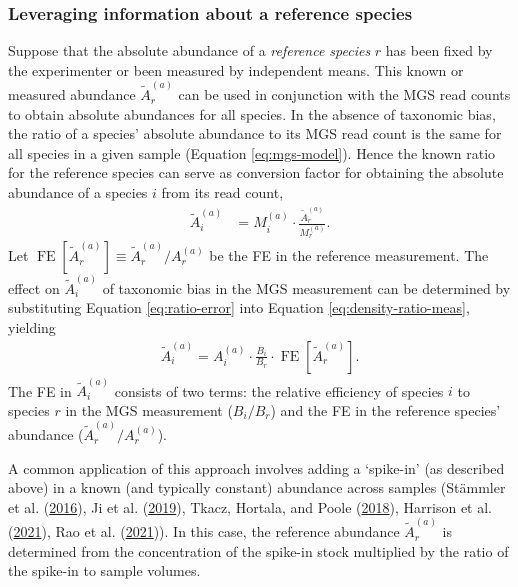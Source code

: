 \documentclass[
]{article}
\begin{document}
\hypertarget{leveraging-information-about-a-reference-species}{%
\subsubsection{Leveraging information about a reference species}\label{leveraging-information-about-a-reference-species}}

Suppose that the absolute abundance of a \emph{reference species} \(r\) has been fixed by the experimenter or been measured by independent means.
This known or measured abundance \(\tilde A_{r}^{(a)}\) can be used in conjunction with the MGS read counts to obtain absolute abundances for all species.
In the absence of taxonomic bias, the ratio of a species' absolute abundance to its MGS read count is the same for all species in a given sample (Equation \eqref{eq:mgs-model}).
Hence the known ratio for the reference species can serve as conversion factor for obtaining the absolute abundance of a species \(i\) from its read count,
\begin{align}
  \label{eq:density-ratio-meas}
  \tilde A_i^{(a)} &= M_i^{(a)} \cdot \frac{\tilde A_r^{(a)}}{M_r^{(a)}}.
\end{align}
Let \(\mathop{\mathrm{FE}}[\tilde A_r^{(a)}] \equiv {\tilde A_r^{(a)}}/{A_r^{(a)}}\) be the FE in the reference measurement.
The effect on \(\tilde A_i^{(a)}\) of taxonomic bias in the MGS measurement can be determined by substituting Equation \eqref{eq:ratio-error} into Equation \eqref{eq:density-ratio-meas}, yielding
\begin{align}
  \label{eq:density-ratio-error}
  \tilde A_i^{(a)} = A_i^{(a)} \cdot \frac{B_i}{B_r} \cdot 
    \mathop{\mathrm{FE}}\left[\tilde A_r^{(a)}\right].
\end{align}
The FE in \(\tilde A_i^{(a)}\) consists of two terms: the relative efficiency of species \(i\) to species \(r\) in the MGS measurement (\({B_i}/{B_r}\)) and the FE in the reference species' abundance (\({\tilde A_r^{(a)}}/{A_r^{(a)}}\)).

A common application of this approach involves adding a `spike-in' (as described above) in a known (and typically constant) abundance across samples (Stämmler et al. (\protect\hyperlink{ref-stammler2016adju}{2016}), Ji et al. (\protect\hyperlink{ref-ji2019quan}{2019}), Tkacz, Hortala, and Poole (\protect\hyperlink{ref-tkacz2018abso}{2018}), Harrison et al. (\protect\hyperlink{ref-harrison2021theq}{2021}), Rao et al. (\protect\hyperlink{ref-rao2021mult}{2021})).
In this case, the reference abundance \(\tilde A_r^{(a)}\) is determined from the concentration of the spike-in stock multiplied by the ratio of the spike-in to sample volumes.
\end{document}
